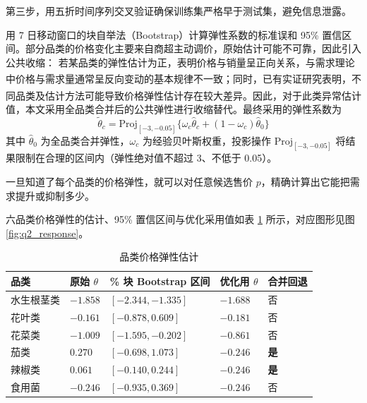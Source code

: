 \documentclass[withoutpreface,bwprint]{cumcmthesis} %
\numberwithin{equation}{section}
\begin{document}
\begin{enumerate}
\hspace*{2em}第三步，用五折时间序列交叉验证确保训练集严格早于测试集，避免信息泄露。

用 7 日移动窗口的块自举法（Bootstrap）计算弹性系数的标准误和 95\% 置信区间。部分品类的价格变化主要来自商超主动调价，原始估计可能不可靠，因此引入公共收缩：
若某品类的弹性估计为正，表明价格与销量呈正向关系，与需求理论中价格与需求量通常呈反向变动的基本规律不一致\textsuperscript{\cite{marshall1920}}；同时，已有实证研究表明，不同品类及估计方法可能导致价格弹性估计存在较大差异\textsuperscript{\cite{tellis1988}}。因此，对于此类异常估计值，本文采用全品类合并后的公共弹性进行收缩替代。最终采用的弹性系数为
\begin{equation}
    \tilde{\theta}_c = \mathrm{Proj}_{[-3,-0.05]}\Big\{\omega_c\hat{\theta}_c + (1-\omega_c)\hat{\theta}_0\Big\}
\end{equation}
其中 $\hat{\theta}_0$ 为全品类合并弹性，$\omega_c$ 为经验贝叶斯权重，投影操作 $\mathrm{Proj}_{[-3,-0.05]}$ 将结果限制在合理的区间内（弹性绝对值不超过 3、不低于 0.05）。

\hspace*{2em}一旦知道了每个品类的价格弹性，就可以对任意候选售价 $p$，精确计算出它能把需求提升或抑制多少。




\hspace*{2em}六品类价格弹性的估计、95\% 置信区间与优化采用值如表 \ref{tab:q2_resp} 所示，对应图形见图 \ref{fig:q2_response}。

\begin{table}[H]
\centering
\begin{tabularx}{\textwidth}{>{\hsize=1.0\hsize\centering\arraybackslash}X>{\hsize=0.8\hsize\centering\arraybackslash}X>{\hsize=1.6\hsize\centering\arraybackslash}X>{\hsize=0.8\hsize\centering\arraybackslash}X>{\hsize=0.8\hsize\centering\arraybackslash}X}
\toprule
品类 & 原始 $\theta$ & 95\% 块 Bootstrap 区间 & 优化用 $\theta$ & 合并回退 \\
\midrule
水生根茎类 & $-1.858$ & $[-2.344,-1.335]$ & \textbf{$-1.688$} & 否 \\
花叶类 & $-0.161$ & $[-0.878,0.609]$ & $-0.181$ & 否 \\
花菜类 & $-1.009$ & $[-1.595,-0.202]$ & \textbf{$-0.861$} & 否 \\
茄类 & $0.270$ & $[-0.698,1.073]$ & $-0.246$ & \textbf{是} \\
辣椒类 & $0.061$ & $[-0.140,0.244]$ & $-0.246$ & \textbf{是} \\
食用菌 & $-0.246$ & $[-0.935,0.369]$ & $-0.246$ & 否 \\
\bottomrule
\end{tabularx}
\caption{品类价格弹性估计}
\label{tab:q2_resp}
\end{table}


\end{enumerate}
\end{document}
